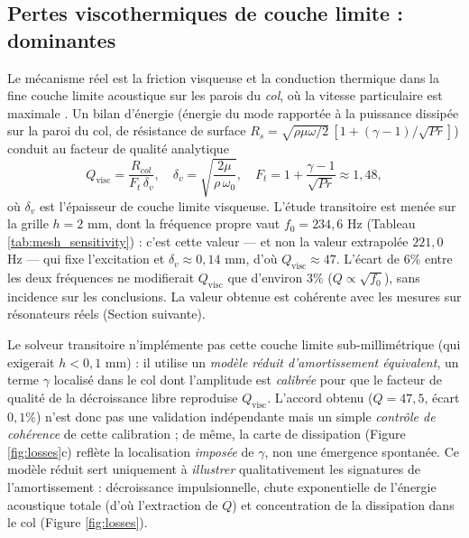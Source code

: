 \documentclass[11pt,a4paper,twocolumn]{article}
\begin{document}
\subsection{Pertes viscothermiques de couche limite : dominantes}
Le mécanisme réel est la friction visqueuse et la conduction thermique dans la fine couche limite acoustique sur les parois du \emph{col}, où la vitesse particulaire est maximale \cite{crandall1926theory, morse1968theoretical}. Un bilan d'énergie (énergie du mode rapportée à la puissance dissipée sur la paroi du col, de résistance de surface $R_s=\sqrt{\rho\mu\omega/2}\,[1+(\gamma-1)/\sqrt{Pr}]$) conduit au facteur de qualité analytique
\begin{equation}
\label{eq:Qvisc}
Q_{\mathrm{visc}} = \frac{R_{col}}{F_t\,\delta_v}, \quad \delta_v=\sqrt{\frac{2\mu}{\rho\,\omega_0}}, \quad F_t = 1+\frac{\gamma-1}{\sqrt{Pr}}\approx 1{,}48,
\end{equation}
où $\delta_v$ est l'épaisseur de couche limite visqueuse. L'étude transitoire est menée sur la grille $h=2$ mm, dont la fréquence propre vaut $f_0 = 234{,}6\text{ Hz}$ (Tableau \ref{tab:mesh_sensitivity}) : c'est cette valeur — et non la valeur extrapolée $221{,}0$ Hz — qui fixe l'excitation et $\delta_v\approx0{,}14\text{ mm}$, d'où $Q_{\mathrm{visc}}\approx47$. L'écart de $6\%$ entre les deux fréquences ne modifierait $Q_{\mathrm{visc}}$ que d'environ $3\%$ ($Q\propto\sqrt{f_0}$), sans incidence sur les conclusions. La valeur obtenue est cohérente avec les mesures sur résonateurs réels (Section suivante).

Le solveur transitoire n'implémente pas cette couche limite sub-millimétrique (qui exigerait $h<0{,}1\text{ mm}$) : il utilise un \emph{modèle réduit d'amortissement équivalent}, un terme $\gamma$ localisé dans le col dont l'amplitude est \emph{calibrée} pour que le facteur de qualité de la décroissance libre reproduise $Q_{\mathrm{visc}}$. L'accord obtenu ($Q=47{,}5$, écart $0{,}1\%$) n'est donc pas une validation indépendante mais un simple \emph{contrôle de cohérence} de cette calibration ; de même, la carte de dissipation (Figure \ref{fig:losses}c) reflète la localisation \emph{imposée} de $\gamma$, non une émergence spontanée. Ce modèle réduit sert uniquement à \emph{illustrer} qualitativement les signatures de l'amortissement : décroissance impulsionnelle, chute exponentielle de l'énergie acoustique totale (d'où l'extraction de $Q$) et concentration de la dissipation dans le col (Figure \ref{fig:losses}).
\end{document}
